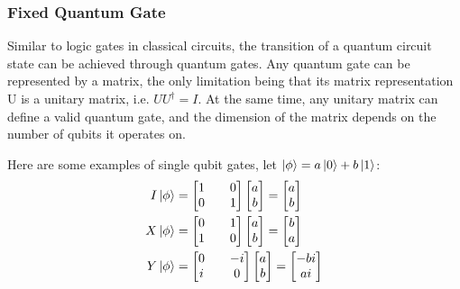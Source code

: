 \subsubsection{Fixed Quantum Gate}
Similar to logic gates in classical circuits, the transition of a quantum circuit state can be achieved through quantum gates. Any quantum gate can be represented by a matrix, the only limitation being that its matrix representation U is a unitary matrix, i.e. ${UU^{\dagger}=I}$.
At the same time, any unitary matrix can define a valid quantum gate, and the dimension of the matrix depends on the number of qubits it operates on.

Here are some examples of single qubit gates, let $\ket{\phi}=a\ket{0}+b\ket{1}$:
\begin{align*}
    I\ket{\phi} & =
    \begin{bmatrix}
        1 &  & 0 \\
        0 &  & 1
    \end{bmatrix}
    \begin{bmatrix}
        a \\
        b
    \end{bmatrix}=
    \begin{bmatrix}
        a \\
        b
    \end{bmatrix}  \\
    X\ket{\phi} & =
    \begin{bmatrix}
        0 &  & 1 \\
        1 &  & 0
    \end{bmatrix}
    \begin{bmatrix}
        a \\
        b
    \end{bmatrix}=
    \begin{bmatrix}
        b \\
        a
    \end{bmatrix}  \\
    Y\ket{\phi} & =
    \begin{bmatrix}
        0 &  & -i \\
        i &  & 0
    \end{bmatrix}
    \begin{bmatrix}
        a \\
        b
    \end{bmatrix}=
    \begin{bmatrix}
        -bi \\
        ai
    \end{bmatrix}  \\

\end{align*}

